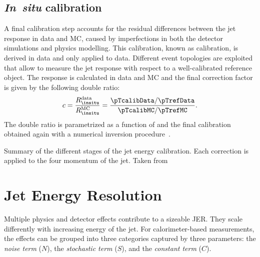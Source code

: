 \subsection{\textbf{\emph{In~situ}} calibration}
\label{subsec:insitu-calibration}
A final calibration step accounts for the residual differences between the jet response in data and MC, caused by imperfections in both the detector simulations and physics modelling. This calibration, known as \insitu calibration, is derived in data and only applied to data.
Different event topologies are exploited that allow to measure the jet response with respect to a well-calibrated reference object. The \insitu response is calculated in data and MC and the final correction factor is given by the following double ratio:
\begin{equation}
    c = \frac{R_{\insitu}^{\text{data}}}{R_{\insitu}^{\text{MC}}} = \frac{ \pTcalibData / \pTrefData}{\pTcalibMC / \pTrefMC}.
\end{equation}
The double ratio is parametrized as a function of \pTref and the final calibration obtained again with a numerical inversion procedure~\cite{PERF-2011-03}.




\begin{table}
    \caption{Summary of the different stages of the jet energy calibration. Each correction is applied to the four momentum of the jet. Taken from }
    \label{tab:jes-calibration}
\end{table}


\section{Jet Energy Resolution}
Multiple physics and detector effects contribute to a sizeable JER. They scale differently with increasing energy of the jet. For calorimeter-based measurements, the effects can be grouped into three categories captured by three parameters: the \emph{noise term} ($N$), the \emph{stochastic term} ($S$), and the \emph{constant term} ($C$).

